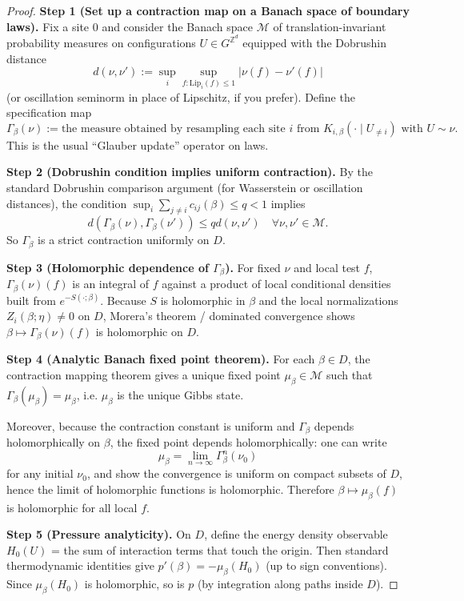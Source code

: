 \begin{proof}
\textbf{Step 1 (Set up a contraction map on a Banach space of boundary laws).}
Fix a site $0$ and consider the Banach space $\mathcal M$ of translation-invariant probability measures on configurations $U\in G^{\mathbb Z^d}$ equipped with the Dobrushin distance
\[
d(\nu,\nu') := \sup_{i}\sup_{f:\mathrm{Lip}_i(f)\le 1}\big|\nu(f)-\nu'(f)\big|
\]
(or oscillation seminorm in place of Lipschitz, if you prefer). Define the specification map
\[
\Gamma_\beta(\nu) := \text{the measure obtained by resampling each site } i \text{ from } K_{i,\beta}(\cdot\mid U_{\neq i}) \text{ with } U\sim\nu.
\]
This is the usual ``Glauber update'' operator on laws.

\textbf{Step 2 (Dobrushin condition implies uniform contraction).}
By the standard Dobrushin comparison argument (for Wasserstein or oscillation distances), the condition $\sup_i\sum_{j\neq i} c_{ij}(\beta)\le q<1$ implies
\[
d(\Gamma_\beta(\nu),\Gamma_\beta(\nu')) \le q d(\nu,\nu') \quad\forall \nu,\nu'\in\mathcal M.
\]
So $\Gamma_\beta$ is a strict contraction uniformly on $D$.

\textbf{Step 3 (Holomorphic dependence of $\Gamma_\beta$).}
For fixed $\nu$ and local test $f$, $\Gamma_\beta(\nu)(f)$ is an integral of $f$ against a product of local conditional densities built from $e^{-S(\cdot;\beta)}$. Because $S$ is holomorphic in $\beta$ and the local normalizations $Z_{{i}}(\beta;\eta)\neq 0$ on $D$, Morera's theorem / dominated convergence shows $\beta\mapsto \Gamma_\beta(\nu)(f)$ is holomorphic on $D$.

\textbf{Step 4 (Analytic Banach fixed point theorem).}
For each $\beta\in D$, the contraction mapping theorem gives a unique fixed point $\mu_\beta\in\mathcal M$ such that $\Gamma_\beta(\mu_\beta)=\mu_\beta$, i.e. $\mu_\beta$ is the unique Gibbs state.

Moreover, because the contraction constant is uniform and $\Gamma_\beta$ depends holomorphically on $\beta$, the fixed point depends holomorphically: one can write
\[
\mu_\beta = \lim_{n\to\infty}\Gamma_\beta^{n}(\nu_0)
\]
for any initial $\nu_0$, and show the convergence is uniform on compact subsets of $D$, hence the limit of holomorphic functions is holomorphic. Therefore $\beta\mapsto\mu_\beta(f)$ is holomorphic for all local $f$.

\textbf{Step 5 (Pressure analyticity).}
On $D$, define the energy density observable $H_0(U)$ = the sum of interaction terms that touch the origin. Then standard thermodynamic identities give $p'(\beta)=-\mu_\beta(H_0)$ (up to sign conventions). Since $\mu_\beta(H_0)$ is holomorphic, so is $p$ (by integration along paths inside $D$).
\end{proof}

